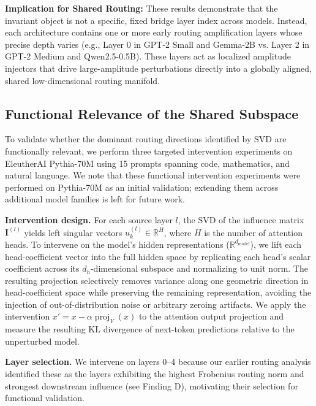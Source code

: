 \documentclass[11pt,a4paper]{article}
\theoremstyle{definition}
\theoremstyle{plain}
\begin{document}
\textbf{Implication for Shared Routing:} These results demonstrate that the invariant object is not a specific, fixed bridge layer index across models. Instead, each architecture contains one or more early routing amplification layers whose precise depth varies (e.g., Layer 0 in GPT-2 Small and Gemma-2B vs. Layer 2 in GPT-2 Medium and Qwen2.5-0.5B). These layers act as localized amplitude injectors that drive large-amplitude perturbations directly into a globally aligned, shared low-dimensional routing manifold.

\subsection{Functional Relevance of the Shared Subspace}
To validate whether the dominant routing directions identified by SVD are functionally relevant, we perform three targeted intervention experiments on EleutherAI Pythia-70M using 15 prompts spanning code, mathematics, and natural language. We note that these functional intervention experiments were performed on Pythia-70M as an initial validation; extending them across additional model families is left for future work.

\textbf{Intervention design.} For each source layer $l$, the SVD of the influence matrix $\mathbf{I}^{(l)}$ yields left singular vectors $u_k^{(l)} \in \mathbb{R}^{H}$, where $H$ is the number of attention heads. To intervene on the model's hidden representations ($\mathbb{R}^{d_{\mathrm{model}}}$), we lift each head-coefficient vector into the full hidden space by replicating each head's scalar coefficient across its $d_h$-dimensional subspace and normalizing to unit norm. The resulting projection selectively removes variance along one geometric direction in head-coefficient space while preserving the remaining representation, avoiding the injection of out-of-distribution noise or arbitrary zeroing artifacts. We apply the intervention $x' = x - \alpha \operatorname{proj}_V(x)$ to the attention output projection and measure the resulting KL divergence of next-token predictions relative to the unperturbed model.

\textbf{Layer selection.} We intervene on layers 0--4 because our earlier routing analysis identified these as the layers exhibiting the highest Frobenius routing norm and strongest downstream influence (see Finding D), motivating their selection for functional validation.
\end{document}
